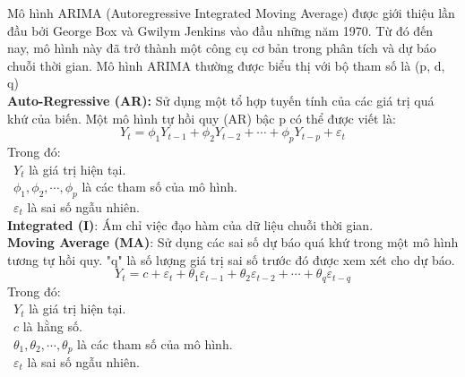 Mô hình ARIMA (Autoregressive Integrated Moving Average) được giới thiệu lần đầu bởi George Box và Gwilym Jenkins vào đầu những năm 1970. Từ đó đến nay, mô hình này đã trở thành một công cụ cơ bản trong phân tích và dự báo chuỗi thời gian. Mô hình ARIMA thường được biểu thị với bộ tham số là (p, d, q)\\
\textbf{Auto-Regressive (AR):} Sử dụng một tổ hợp tuyến tính của các giá trị quá khứ của biến. Một mô hình tự hồi quy (AR) bậc p có thể được viết là:
\[
Y_{t}=\phi_{1}Y_{t-1}+\phi_{2}Y_{t-2}+\cdots+\phi_{p}Y_{t-p}+\varepsilon_{t}
\]
Trong đó:\\
    \indent\textbullet\ \(Y_{t}\) là giá trị hiện tại.\\
    \indent\textbullet\ \(\phi_{1},\phi_{2},\cdots,\phi_{p}\) là các tham số của mô hình.\\
    \indent\textbullet\ \(\varepsilon_{t}\) là sai số ngẫu nhiên.\\
\textbf{Integrated (I)}: Ám chỉ việc đạo hàm của dữ liệu chuỗi thời gian.\\
\textbf{Moving Average (MA)}: Sử dụng các sai số dự báo quá khứ trong một mô hình tương tự hồi quy. "q" là số lượng giá trị sai số trước đó được xem xét cho dự báo.
\[
Y_{t}=c+\varepsilon_{t}+\theta_{1}\varepsilon_{t-1}+\theta_{2}\varepsilon_{t-2}+ \cdots+ \theta_{q}\varepsilon_{t-q}
\]
Trong đó:\\
    \indent\textbullet\ \(Y_{t}\) là giá trị hiện tại.\\
    \indent\textbullet\ \(c\) là hằng số.\\
    \indent\textbullet\ \(\theta_{1},\theta_{2},\cdots,\theta_{p}\) là các tham số của mô hình.\\
    \indent\textbullet\ \(\varepsilon_{t}\) là sai số ngẫu nhiên.\\